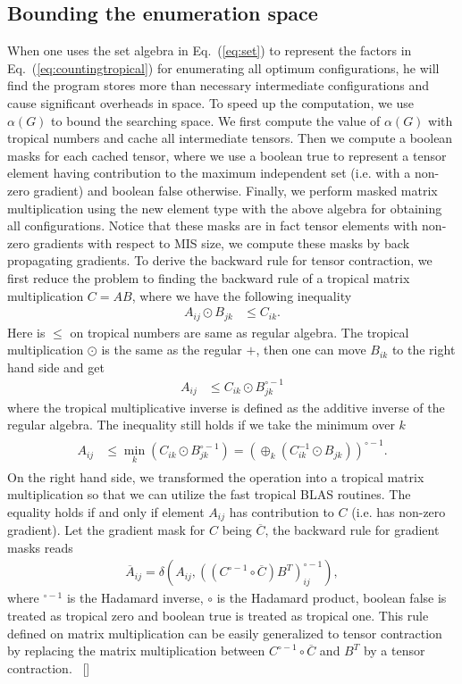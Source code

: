 \documentclass[review,onefignum,onetabnum]{siamart190516}
\newcommand{\<}{\langle}
\renewcommand{\>}{\rangle}
\newcommand{\Eq}[1]{Eq.~(\ref{#1})}
\newcommand{\blue}[1]{[{\bf  \color{blue}{JG: #1}}]}
\begin{document}
\subsection{Bounding the enumeration space}
When one uses the set algebra in \Eq{eq:set} to represent the factors in \Eq{eq:countingtropical} for enumerating all optimum configurations, he will find the program stores more than necessary intermediate configurations and cause significant overheads in space.
To speed up the computation, we use $\alpha(G)$ to bound the searching space.
We first compute the value of $\alpha(G)$ with tropical numbers and cache all intermediate tensors.
Then we compute a boolean masks for each cached tensor, where we use a boolean true to represent a tensor element having contribution to the maximum independent set (i.e. with a non-zero gradient) and boolean false otherwise.
Finally, we perform masked matrix multiplication using the new element type with the above algebra for obtaining all configurations.
Notice that these masks are in fact tensor elements with non-zero gradients with respect to MIS size, we compute these masks by back propagating gradients.
To derive the backward rule for tensor contraction,
we first reduce the problem to finding the backward rule of a tropical matrix multiplication $C = A B$,
where we have the following inequality
\begin{align}
    A_{ij} \odot B_{jk} &\leq C_{ik}.
\end{align}
Here is $\leq$ on tropical numbers are same as regular algebra.
The tropical multiplication $\odot$ is the same as the regular $+$, then
one can move $B_{ik}$ to the right hand side and get
\begin{align}
    A_{ij} &\leq C_{ik} \odot B_{jk}^{\circ -1}
\end{align}
where the tropical multiplicative inverse is defined as the additive inverse of the regular algebra.
The inequality still holds if we take the minimum over $k$
\begin{align}
    \begin{split}
    A_{ij} &\leq \min_{k}(C_{ik} \odot B_{jk}^{\circ -1}) = (\oplus_{k} (C_{ik}^{-1} \odot B_{jk}))^{\circ -1}.
    \end{split}
\end{align}
On the right hand side, we transformed the operation into a tropical matrix multiplication so that we can utilize the fast tropical BLAS routines.
The equality holds if and only if element $A_{ij}$ has contribution to $C$ (i.e. has non-zero gradient).
Let the gradient mask for $C$ being $\overline C$, the backward rule for gradient masks reads
\begin{align}
\overline{A}_{ij} = \delta(A_{ij}, ((C^{\circ-1} \circ \overline C )B^T)_{ij}^{\circ -1}),
\end{align}
where ${}^{\circ -1}$ is the Hadamard inverse, $\circ$ is the Hadamard product, boolean false is treated as tropical zero and boolean true is treated as tropical one.
This rule defined on matrix multiplication can be easily generalized to tensor contraction by replacing the matrix multiplication between $C^{\circ-1} \circ \overline C$ and $B^T$ by a tensor contraction.~\cite{} \blue{maybe add an appendix?}  %
\end{document}
